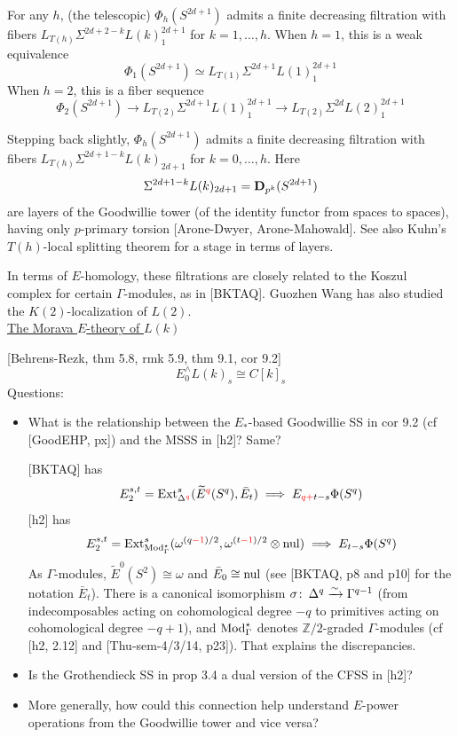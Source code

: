 \documentclass{rs}
\theoremstyle{definition}
\theoremstyle{remark}
\def\co{\colon\thinspace}
\newcommand{\mb}[1]{\mathbb{#1}}
\newcommand{\Mod}{{\rm Mod}}
\newcommand{\bd}{{\bf D}}
\newcommand{\BZ}{{\mb Z}}
\newcommand{\Ext}{{\rm Ext}}
\newcommand{\nul}{{\rm nul}}
\newcommand{\G}{\Gamma}
\renewcommand{\=}{\approx}
\renewcommand{\-}{\sim}
\newcommand{\rd}[1]{\textcolor{red}{#1}}
\numberwithin{equation}{section}
\numberwithin{thm}{section}
\begin{document}
For any $h$, (the telescopic) $\Phi_h(S^{2 d + 1})$ 
admits a finite decreasing filtration with fibers 
$L_{T(h)} \Sigma^{2 d + 2 - k} L(k)_1^{2 d + 1}$ for $k = 1, \ldots, h$.  
When $h = 1$, this is a weak equivalence 
\begin{equation}
 \label{BK1}
 \Phi_1(S^{2 d + 1}) \simeq L_{T(1)} \Sigma^{2 d + 1} L(1)_1^{2 d + 1} 
\end{equation}
When $h = 2$, this is a fiber sequence 
\begin{equation}
 \label{BK2}
 \Phi_2(S^{2 d + 1}) \to L_{T(2)} \Sigma^{2 d + 1} L(1)_1^{2 d + 1} \to L_{T(2)} \Sigma^{2 d} L(2)_1^{2 d + 1} 
\end{equation}

Stepping back slightly, $\Phi_h(S^{2 d + 1})$ 
admits a finite decreasing filtration with fibers 
$L_{T(h)} \Sigma^{2 d + 1 - k} L(k)_{2 d + 1}$ for $k = 0, \ldots, h$.  Here 
\begin{equation}
 \label{Goode}
 \Sigma^{2 d + 1 - k} L(k)_{2 d + 1} = \bd_{p^k}(S^{2 d + 1}) 
\end{equation}
are layers of the Goodwillie tower (of the identity functor from spaces to spaces), 
having only $p$-primary torsion [Arone-Dwyer, Arone-Mahowald].  
See also Kuhn's $T(h)$-local splitting theorem for a stage in terms of layers.  

In terms of $E$-homology, these filtrations are closely related 
to the Koszul complex for certain $\G$-modules, as in [BKTAQ].  
Guozhen Wang has also studied the $K(2)$-localization of $L(2)$.  \\

\underline{The Morava $E$-theory of $L(k)$}

[Behrens-Rezk, thm 5.8, rmk 5.9, thm 9.1, cor 9.2] 
\[
 E^\wedge_0 L(k)_s \cong C[k]_s 
\]
Questions: 
\begin{itemize}
 \item What is the relationship between the $E_*$-based Goodwillie SS 
 in cor 9.2 (cf [GoodEHP, px]) and the MSSS in [h2]?  Same?  

 [BKTAQ] has 
 \[
  E_2^{s, t} = \Ext_{\Delta^{\rd{q}}}^s(\widetilde{E}^{\rd{q}}(S^q), \bar{E}_t) \implies E_{\rd{q +} t - s} \Phi(S^q) 
 \]
 [h2] has 
 \[
  E_2^{s, t} = \Ext_{\Mod_\G^\star}^s(\omega^{(q \rd{- 1}) / 2}, \omega^{(t \rd{- 1}) / 2} \otimes \nul) \implies E_{t - s} \Phi(S^q) 
 \]
 As $\G$-modules, $\widetilde{E}^0(S^2) \cong \omega$ and $\bar{E}_0 \cong \nul$ 
 (see [BKTAQ, p8 and p10] for the notation $\bar{E}_t$).  
 There is a canonical isomorphism $\sigma \co \Delta^q \xrightarrow{\sim} \Gamma^{q - 1}$ 
 (from indecomposables acting on cohomological degree $-q$ 
 to primitives acting on cohomological degree $-q + 1$), 
 and $\Mod_\G^\star$ denotes $\BZ/2$-graded $\Gamma$-modules 
 (cf [h2, 2.12] and [Thu-sem-4/3/14, p23]).  
 That explains the discrepancies.  

 \item Is the Grothendieck SS in prop 3.4 a dual version of the CFSS in [h2]?  

 \item More generally, how could this connection help understand 
 $E$-power operations from the Goodwillie tower and vice versa?  
\end{itemize}
\end{document}
